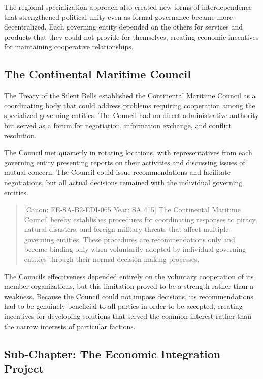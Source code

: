 The regional specialization approach also created new forms of
interdependence that strengthened political unity even as formal
governance became more decentralized. Each governing entity depended on
the others for services and products that they could not provide for
themselves, creating economic incentives for maintaining cooperative
relationships.

\subsection{The Continental Maritime
Council}\label{the-continental-maritime-council}

The Treaty of the Silent Bells established the Continental Maritime
Council as a coordinating body that could address problems requiring
cooperation among the specialized governing entities. The Council had no
direct administrative authority but served as a forum for negotiation,
information exchange, and conflict resolution.

The Council met quarterly in rotating locations, with representatives
from each governing entity presenting reports on their activities and
discussing issues of mutual concern. The Council could issue
recommendations and facilitate negotiations, but all actual decisions
remained with the individual governing entities.

\begin{quote}
{[}Canon: FE-SA-B2-EDI-065 \textbar{} Year: SA 415{]} The Continental
Maritime Council hereby establishes procedures for coordinating
responses to piracy, natural disasters, and foreign military threats
that affect multiple governing entities. These procedures are
recommendations only and become binding only when voluntarily adopted by
individual governing entities through their normal decision-making
processes.
\end{quote}

The Council\textquotesingle s effectiveness depended entirely on the
voluntary cooperation of its member organizations, but this limitation
proved to be a strength rather than a weakness. Because the Council
could not impose decisions, its recommendations had to be genuinely
beneficial to all parties in order to be accepted, creating incentives
for developing solutions that served the common interest rather than the
narrow interests of particular factions.

\subsection{Sub-Chapter: The Economic Integration
Project}\label{sub-chapter-the-economic-integration-project-1}

